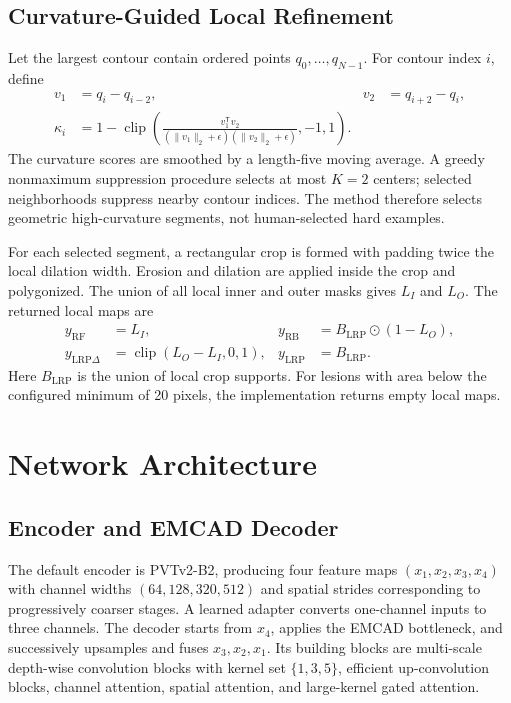 \documentclass[journal]{IEEEtran}
\begin{document}
\subsection{Curvature-Guided Local Refinement}
Let the largest contour contain ordered points $q_0,\ldots,q_{N-1}$. For contour index $i$, define
\begin{align}
 v_1 &= q_i-q_{i-2}, & v_2&=q_{i+2}-q_i,\\
 \kappa_i&=1-\operatorname{clip}\left(\frac{v_1^\mathsf{T}v_2}{(\|v_1\|_2+\epsilon)(\|v_2\|_2+\epsilon)},-1,1\right).
\end{align}
The curvature scores are smoothed by a length-five moving average. A greedy nonmaximum suppression procedure selects at most $K=2$ centers; selected neighborhoods suppress nearby contour indices. The method therefore selects geometric high-curvature segments, not human-selected hard examples.

For each selected segment, a rectangular crop is formed with padding twice the local dilation width. Erosion and dilation are applied inside the crop and polygonized. The union of all local inner and outer masks gives $L_I$ and $L_O$. The returned local maps are
\begin{align}
 y_{\mathrm{RF}}&=L_I, & y_{\mathrm{RB}}&=B_{\mathrm{LRP}}\odot(1-L_O),\\
 y_{\mathrm{LRP}\Delta}&=\operatorname{clip}(L_O-L_I,0,1), & y_{\mathrm{LRP}}&=B_{\mathrm{LRP}}.
\end{align}
Here $B_{\mathrm{LRP}}$ is the union of local crop supports. For lesions with area below the configured minimum of 20 pixels, the implementation returns empty local maps.

\section{Network Architecture}
\subsection{Encoder and EMCAD Decoder}
The default encoder is PVTv2-B2, producing four feature maps $(x_1,x_2,x_3,x_4)$ with channel widths $(64,128,320,512)$ and spatial strides corresponding to progressively coarser stages. A learned adapter converts one-channel inputs to three channels. The decoder starts from $x_4$, applies the EMCAD bottleneck, and successively upsamples and fuses $x_3,x_2,x_1$. Its building blocks are multi-scale depth-wise convolution blocks with kernel set $\{1,3,5\}$, efficient up-convolution blocks, channel attention, spatial attention, and large-kernel gated attention.
\end{document}
